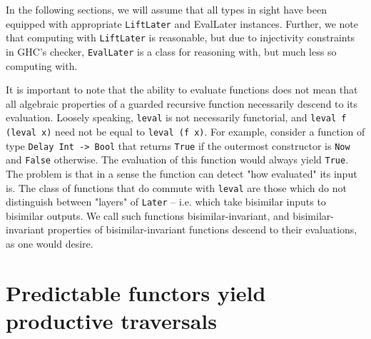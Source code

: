\documentclass[hoptionsi,review,format=sigplan]{acmart}
\newcommand{\hs}{\texttt}
\begin{document}
In the following sections, we will assume that all types in sight have been equipped with appropriate \hs{LiftLater} and {EvalLater} instances. Further, we note that computing with \hs{LiftLater} is reasonable, but due to injectivity constraints in GHC's checker, \hs{EvalLater} is a class for reasoning with, but much less so computing with.

It is important to note that the ability to evaluate functions does not mean that all algebraic properties of a guarded recursive function necessarily descend to its evaluation. Loosely speaking, \hs{leval} is not necessarily functorial, and \hs{leval f (leval x)} need not be equal to \hs{leval (f x)}. For example, consider a function of type \hs{Delay Int -> Bool} that returns \hs{True} if the outermost constructor is \hs{Now} and \hs{False} otherwise. The evaluation of this function would always yield \hs{True}. The problem is that in a sense the function can detect "how evaluated" its input is. The class of functions that do commute with \hs{leval} are those which do not distinguish between "layers" of \hs{Later} -- i.e. which take bisimilar inputs to bisimilar outputs. We call such functions bisimilar-invariant, and  bisimilar-invariant properties of bisimilar-invariant functions descend to their evaluations, as one would desire.


\section{Predictable functors yield productive traversals}




\end{document}
